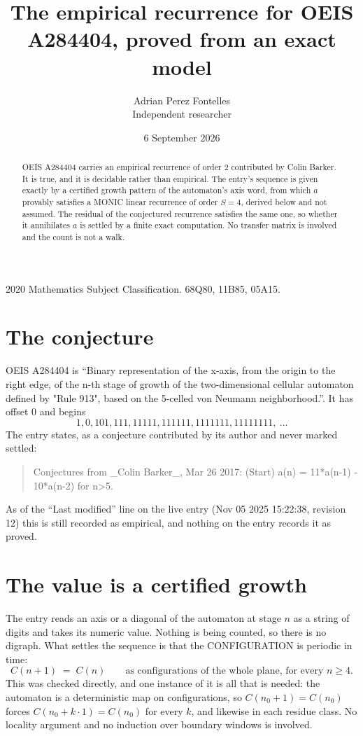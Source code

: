 \documentclass[11pt,a4paper]{article}
\title{The empirical recurrence for OEIS A284404, proved from an exact model}
\author{Adrian Perez Fontelles\\ \small Independent researcher}
\date{6 September 2026}
\theoremstyle{plain}
\theoremstyle{definition}
\begin{document}
\maketitle

\begin{abstract}
OEIS A284404 carries an empirical recurrence of order $2$ contributed by Colin Barker. It is true, and it is
decidable rather than empirical. The entry's sequence is given exactly by a certified growth pattern of the automaton's axis word, from
which $a$ provably satisfies a MONIC linear recurrence of order $S=4$, derived below and not
assumed. The residual of the conjectured recurrence satisfies the same one, so whether it
annihilates $a$ is settled by a finite exact computation. No transfer matrix is involved and
the count is not a walk.
\end{abstract}

\noindent\small 2020 Mathematics Subject Classification. 68Q80, 11B85, 05A15.\normalsize

\section{The conjecture}

OEIS A284404 is ``Binary representation of the x-axis, from the origin to the right edge, of the n-th stage of growth of the two-dimensional cellular automaton defined by "Rule 913", based on the 5-celled von Neumann neighborhood.''. It has offset $0$ and begins
\[
1, 0, 101, 111, 11111, 111111, 1111111, 11111111,\ \dots
\]
The entry states, as a conjecture contributed by its author and never marked settled:
\begin{quote}
Conjectures from \_Colin Barker\_, Mar 26 2017: (Start) a(n) = 11*a(n-1) - 10*a(n-2) for n>5.
\end{quote}
As of the ``Last modified'' line on the live entry (Nov 05 2025 15:22:38, revision 12)
this is still recorded as empirical, and nothing on the entry records it as proved.

\section{The value is a certified growth}

The entry reads an axis or a diagonal of the automaton at stage $n$ as a string of digits and
takes its numeric value. Nothing is being counted, so there is no digraph. What settles the
sequence is that the CONFIGURATION is periodic in time:
\[
C(n+1)\;=\;C(n)\qquad\text{as configurations of the whole plane, for every } n\ge 4.
\]
This was checked directly, and one instance of it is all that is needed: the automaton is a
deterministic map on configurations, so $C(n_0+1)=C(n_0)$ forces $C(n_0+k\cdot1)=C(n_0)$ for
every $k$, and likewise in each residue class. No locality argument and no induction over
boundary windows is involved.
\end{document}
